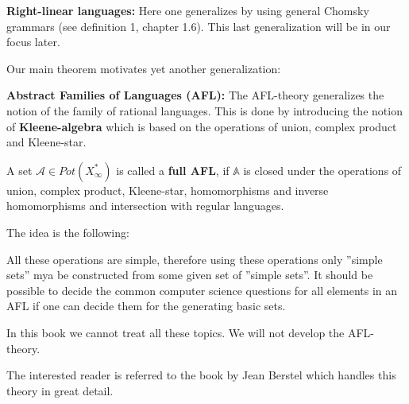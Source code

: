 {\bf Right-linear languages:} Here one generalizes by using general Chomsky
grammars (see definition 1, chapter 1.6). This last generalization will be in
our focus later.

Our main theorem motivates yet another generalization:

{\bf Abstract Families of Languages (AFL):} The AFL-theory generalizes the
notion of the family of rational languages. This is done by introducing the
notion of {\bf Kleene-algebra} which is based on the operations of union,
complex product and Kleene-star.

A set $\mathcal{A} \in Pot(X_\infty^*)$ is called a {\bf full AFL}, if
$\mathbb{A}$ is closed under the operations of union, complex product,
Kleene-star, homomorphisms and inverse homomorphisms and intersection with
regular languages.

The idea is the following:

All these operations are simple, therefore using these operations only ''simple
sets'' mya be constructed from some given set of ''simple sets''. It should be
possible to decide the common computer science questions for all elements in an
AFL if one can decide them for the generating basic sets.

In this book we cannot treat all these topics. We will not develop the
AFL-theory.

The interested reader is referred to the book by Jean Berstel \cite{Be} which
handles this theory in great detail.

